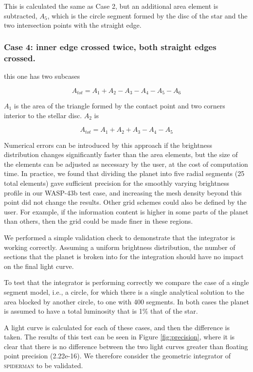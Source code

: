 \documentclass[a4paper,fleqn,usenatbib]{mnras}
\begin{document}
This is calculated the same as Case 2, but an additional area element is subtracted, $A_5$, which is the circle segment formed by the disc of the star and the two intersection points with the straight edge.

\subsubsection{Case 4: inner edge crossed twice, both straight edges crossed.}

this one has two subcases

\begin{equation} \label{eq:inner_outer}
A_{tot} = A_1 + A_2 - A_3 - A_4 - A_5 - A_6
\end{equation}

$A_1$ is the area of the triangle formed by the contact point and two corners interior to the stellar disc. $A_2$ is

\begin{equation} \label{eq:inner_outer}
A_{tot} = A_1 + A_2 + A_3 - A_4 - A_5
\end{equation}

Numerical errors can be introduced by this approach if the brightness distribution changes significantly faster than the area elements, but the size of the elements can be adjusted as necessary by the user, at the cost of computation time.
In practice, we found that dividing the planet into five radial segments (25 total elements) gave sufficient precision for the smoothly varying brightness profile in our WASP-43b test case, and increasing the mesh density beyond this point did not change the results. Other grid schemes could also be defined by the user. For example, if the information content is higher in some parts of the planet than others, then the grid could be made finer in these regions.

We performed a simple validation check to demonstrate that the integrator is working correctly. Assuming a uniform brightness distribution, the number of sections that the planet is broken into for the integration should have no impact on the final light curve.

To test that the integrator is performing correctly we compare the case of a single segment model, i.e., a circle, for which there is a single analytical solution to the area blocked by another circle, to one with 400 segments. In both cases the planet is assumed to have a total luminosity that is 1\% that of the star.

A light curve is calculated for each of these cases, and then the difference is taken. The results of this test can be seen in Figure \ref{fig:precision}, where it is clear that there is no difference between the two light curves greater than floating point precision (2.22e-16). We therefore consider the geometric integrator of \textsc{spiderman} to be validated.
\end{document}
